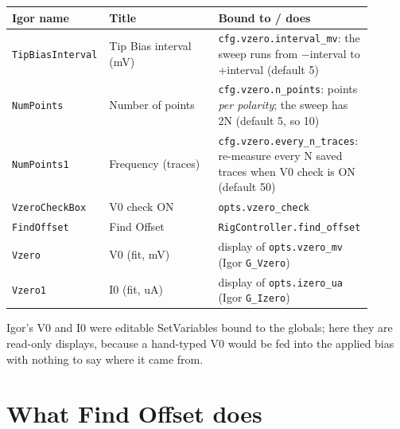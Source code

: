 \small\setlength{\LTleft}{0pt}\setlength{\LTright}{\fill}
\begin{longtable}{@{}>{\raggedright\arraybackslash}p{0.26\linewidth}>{\raggedright\arraybackslash}p{0.30\linewidth}>{\raggedright\arraybackslash}p{0.34\linewidth}@{}}
\toprule
\textbf{Igor name} & \textbf{Title} & \textbf{Bound to / does} \\
\midrule\endhead
\texttt{Tip\discretionary{}{}{}Bias\discretionary{}{}{}Interval} & Tip Bias interval (mV) & \texttt{cfg.\discretionary{}{}{}vzero.\discretionary{}{}{}interval\_\discretionary{}{}{}mv}: the sweep runs from −interval to +interval (default 5) \\
\texttt{Num\discretionary{}{}{}Points} & Number of points & \texttt{cfg.\discretionary{}{}{}vzero.\discretionary{}{}{}n\_\discretionary{}{}{}points}: points \emph{per polarity}; the sweep has 2N (default 5, so 10) \\
\texttt{Num\discretionary{}{}{}Points1} & Frequency (traces) & \texttt{cfg.\discretionary{}{}{}vzero.\discretionary{}{}{}every\_\discretionary{}{}{}n\_\discretionary{}{}{}traces}: re-measure every N saved traces when V0 check is ON (default 50) \\
\texttt{Vzero\discretionary{}{}{}Check\discretionary{}{}{}Box} & V0 check ON & \texttt{opts.\discretionary{}{}{}vzero\_\discretionary{}{}{}check} \\
\texttt{Find\discretionary{}{}{}Offset} & Find Offset & \texttt{Rig\discretionary{}{}{}Controller.\discretionary{}{}{}find\_\discretionary{}{}{}offset} \\
\texttt{Vzero} & V0 (fit, mV) & display of \texttt{opts.\discretionary{}{}{}vzero\_\discretionary{}{}{}mv} (Igor \texttt{G\_\discretionary{}{}{}Vzero}) \\
\texttt{Vzero1} & I0 (fit, uA) & display of \texttt{opts.\discretionary{}{}{}izero\_\discretionary{}{}{}ua} (Igor \texttt{G\_\discretionary{}{}{}Izero}) \\
\bottomrule
\end{longtable}
\normalsize

Igor's V0 and I0 were editable SetVariables bound to the globals; here they are read-only displays, because a hand-typed V0 would be fed into the applied bias with nothing to say where it came from.

\section{What Find Offset does}


